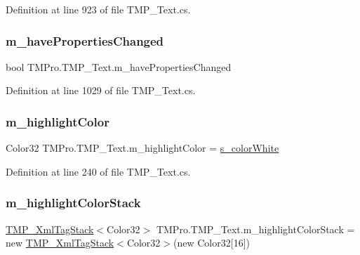 Definition at line 923 of file T\+M\+P\+\_\+\+Text.\+cs.

\mbox{\label{class_t_m_pro_1_1_t_m_p___text_abc4e41157b32183b99e81d20bb22f202}} 
\subsubsection{\texorpdfstring{m\_havePropertiesChanged}{m\_havePropertiesChanged}}
{\footnotesize\ttfamily bool T\+M\+Pro.\+T\+M\+P\+\_\+\+Text.\+m\+\_\+have\+Properties\+Changed\hspace{0.3cm}{\ttfamily [protected]}}



Definition at line 1029 of file T\+M\+P\+\_\+\+Text.\+cs.

\mbox{\label{class_t_m_pro_1_1_t_m_p___text_a260b12c93ccb9cb2afc1d643dcd82c95}} 
\subsubsection{\texorpdfstring{m\_highlightColor}{m\_highlightColor}}
{\footnotesize\ttfamily Color32 T\+M\+Pro.\+T\+M\+P\+\_\+\+Text.\+m\+\_\+highlight\+Color = \mbox{\hyperlink{class_t_m_pro_1_1_t_m_p___text_acb51fd11a369b5109c803b6c57b284d1}{s\+\_\+color\+White}}\hspace{0.3cm}{\ttfamily [protected]}}



Definition at line 240 of file T\+M\+P\+\_\+\+Text.\+cs.

\mbox{\label{class_t_m_pro_1_1_t_m_p___text_a65b10f74bbe635a0bbdbceae7f8ca404}} 
\subsubsection{\texorpdfstring{m\_highlightColorStack}{m\_highlightColorStack}}
{\footnotesize\ttfamily \mbox{\hyperlink{struct_t_m_pro_1_1_t_m_p___xml_tag_stack}{T\+M\+P\+\_\+\+Xml\+Tag\+Stack}}$<$Color32$>$ T\+M\+Pro.\+T\+M\+P\+\_\+\+Text.\+m\+\_\+highlight\+Color\+Stack = new \mbox{\hyperlink{struct_t_m_pro_1_1_t_m_p___xml_tag_stack}{T\+M\+P\+\_\+\+Xml\+Tag\+Stack}}$<$Color32$>$(new Color32\mbox{[}16\mbox{]})\hspace{0.3cm}{\ttfamily [protected]}}



